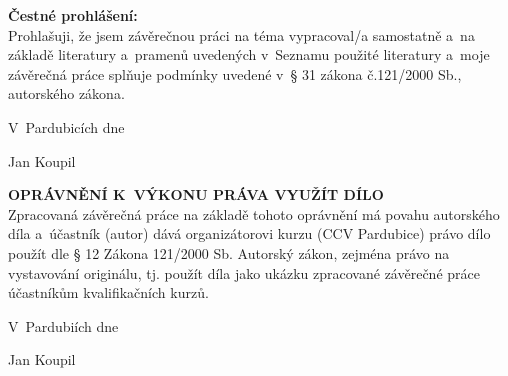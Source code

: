 





\newpage

\setcounter{page}{1}

\vspace*{\fill}

\noindent \textbf{Čestné prohlášení:} \\

Prohlašuji, že jsem závěrečnou práci na téma \textbf{\topic}
vypracoval/a samostatně a~na základě literatury a~pramenů uvedených v~Seznamu použité literatury a~moje závěrečná práce splňuje podmínky uvedené v~§ 31 zákona č.121/2000 Sb., autorského zákona.

\vspace{1cm}

\hfill V~Pardubicích dne \dotfill  
\vspace{1cm}

\hfill
Jan Koupil

\newpage

\vspace*{\fill}

\noindent \textbf{OPRÁVNĚNÍ K~VÝKONU PRÁVA VYUŽÍT DÍLO} \\

Zpracovaná závěrečná práce na základě tohoto oprávnění má povahu autorského díla a~účastník (autor) dává organizátorovi kurzu (CCV Pardubice) právo dílo použít dle § 12 Zákona 121/2000 Sb. Autorský zákon, zejména právo na vystavování originálu, tj. použít díla jako ukázku zpracované závěrečné práce účastníkům kvalifikačních kurzů.

\vspace{1cm}

\hfill V~Pardubiích dne \dotfill  

\hfill
Jan Koupil

\newpage
